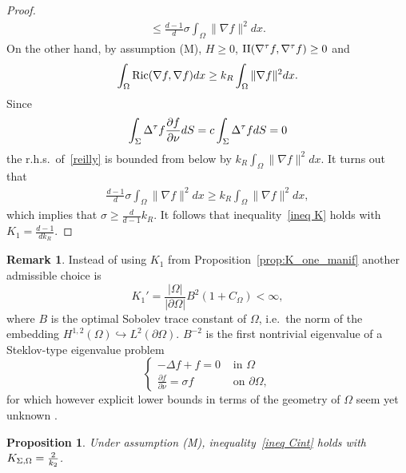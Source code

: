 \documentclass[a4paper]{article}
\newtheorem{proposition}[theorem]{Proposition}
\theoremstyle{definition}
\newtheorem{remark}[theorem]{Remark}
\numberwithin{equation}{section}
\begin{document}
\begin{proof}
\begin{align*}
\leq \frac{d-1}{d} \sigma \int_\Omega \|\nabla f\|^2 dx. 
\end{align*}
On the other hand, by assumption (M), $H \geq 0$, $\mathrm{II} (\nabla^\tau f, \nabla^\tau f)\geq 0$ and 
\begin{align*}
\int_\Omega \operatorname{Ric} (\nabla f, \nabla f) dx 
\geq k_R \int_\Omega \|\nabla f\|^2 dx. 
\end{align*}
Since 
\begin{align*}
\int_\Sigma  \Delta^\tau  f \frac{\partial f}{\partial \nu} dS=c\int_\Sigma  \Delta^\tau  f  dS=0
\end{align*}
the r.h.s.\ of~\eqref{reilly} is bounded from below by $k_R \int_\Omega \|\nabla f\|^2 dx$. It turns out that
\begin{align*}
\frac{d-1}{d} \sigma \int_\Omega \|\nabla f\|^2 dx
\geq k_R \int_\Omega \|\nabla f\|^2 dx,
\end{align*}
which implies that $\sigma\geq \frac{d}{d-1} k_R$. It follows that inequality~\eqref{ineq K} holds with $K_1= \frac{d-1}{d k_R}$. 
\end{proof}

\begin{remark} Instead of using $K_1$ from Proposition~\ref{prop:K_one_manif} another admissible choice  is \[K_1'  = \frac{|\Omega|}{|\partial \Omega|}B^2  (1+C_\Omega)<\infty,\] where $B$ is  the {optimal Sobolev trace constant} of $\Omega$, i.e.\ the norm of the embedding $H^{1,2}(\Omega)\hookrightarrow L^2 (\partial \Omega)$.
 $B^{-2}$ is the first nontrivial eigenvalue of a  Steklov-type eigenvalue problem 
 \begin{equation*}
\begin{cases}
  -\Delta f + f =0 &  \mbox{ in } \Omega \\
 \frac{\partial f}{\partial \nu}  = \sigma f  & \mbox{ on } \partial \Omega,
    \end{cases}\end{equation*}
for which however explicit lower bounds in terms of the geometry of $\Omega$ seem yet unknown \cite{MR1978428,MR1971310, MR3299025,MR1443055,MR2384747}. 
\end{remark}


\begin{proposition} \label{prop:Escobar_ineq}
Under assumption (M), inequality~\eqref{ineq Cint} holds with $K_{\Sigma,\Omega}=\frac{2}{k_2}$. 
\end{proposition}
\end{document}

